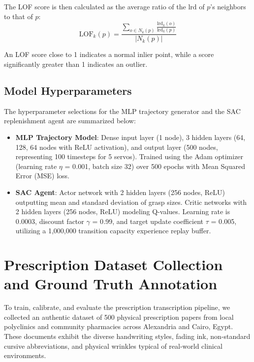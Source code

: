 \documentclass[12pt,a4paper,oneside]{report}
\begin{document}
The LOF score is then calculated as the average ratio of the $\text{lrd}$ of $p$'s neighbors to that of $p$:
\begin{equation}
\text{LOF}_k(p) = \frac{\sum_{o \in N_k(p)} \frac{\text{lrd}_k(o)}{\text{lrd}_k(p)}}{|N_k(p)|}
\end{equation}

An LOF score close to 1 indicates a normal inlier point, while a score significantly greater than 1 indicates an outlier.

\subsection{Model Hyperparameters}\label{model-hyperparameters}

The hyperparameter selections for the MLP trajectory generator and the
SAC replenishment agent are summarized below:

\begin{itemize}
\item
  \textbf{MLP Trajectory Model}: Dense input layer (1 node), 3 hidden
  layers (64, 128, 64 nodes with ReLU activation), and output layer (500
  nodes, representing 100 timesteps for 5 servos). Trained using the
  Adam optimizer (learning rate \emph{$\eta$} = 0\emph{.}001, batch size 32)
  over 500 epochs with Mean Squared Error (MSE) loss.
\item
  \textbf{SAC Agent}: Actor network with 2 hidden layers (256 nodes,
  ReLU) outputting mean and standard deviation of grasp sizes. Critic
  networks with 2 hidden layers (256 nodes, ReLU) modeling Q-values.
  Learning rate is 0\emph{.}0003, discount factor \emph{$\gamma$} =
  0\emph{.}99, and target update coefficient \emph{$\tau$} = 0\emph{.}005,
  utilizing a 1,000,000 transition capacity experience replay buffer.
\end{itemize}

\section{Prescription Dataset Collection and Ground Truth
Annotation}\label{prescription-dataset-collection-and-ground-truth-annotation}

To train, calibrate, and evaluate the prescription transcription
pipeline, we collected an authentic dataset of 500 physical
prescription papers from local polyclinics and community pharmacies
across Alexandria and Cairo, Egypt. These documents exhibit the diverse
handwriting styles, fading ink, non-standard cursive abbreviations, and
physical wrinkles typical of real-world clinical environments.
\end{document}
